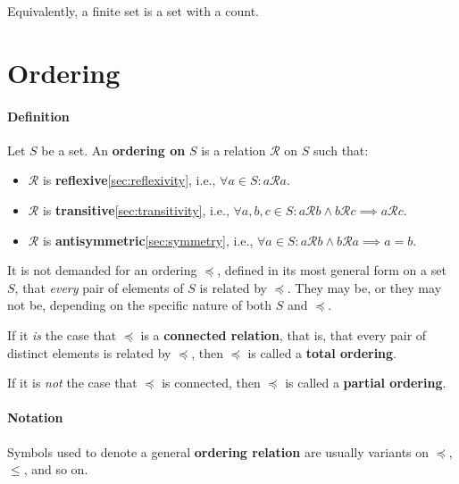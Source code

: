 Equivalently, a finite set is a set with a count.






\section{Ordering}
\label{sec:ordering}

\paragraph{Definition}

Let $S$ be a set. An \textbf{ordering on} $S$ is a relation
$\mathcal{R}$ on $S$ such that:

\begin{itemize}
\item $\mathcal{R}$ is \textbf{reflexive}\ref{sec:reflexivity}, i.e.,
  $\forall a \in S: a \mathcal{R} a$.
\item $\mathcal{R}$ is \textbf{transitive}\ref{sec:transitivity},
  i.e.,
  $\forall a, b, c \in S: a \mathcal{R} b \land b \mathcal{R} c
  \implies a \mathcal{R} c$.
\item $\mathcal{R}$ is \textbf{antisymmetric}\ref{sec:symmetry}, i.e.,
  $\forall a \in S : a \mathcal{R} b \land b \mathcal{R} a \implies a
  = b$.
\end{itemize}

It is not demanded for an ordering $\preceq$, defined in its most
general form on a set $S$, that \textit{every} pair of elements of $S$
is related by $\preceq$. They may be, or they may not be, depending on
the specific nature of both $S$ and $\preceq$.

If it \textit{is} the case that $\preceq$ is a \textbf{connected
  relation}, that is, that every pair of distinct elements is related
by $\preceq$, then $\preceq$ is called a \textbf{total ordering}.

If it is \textit{not} the case that $\preceq$ is connected, then
$\preceq$ is called a \textbf{partial ordering}.


\paragraph{Notation}

Symbols used to denote a general \textbf{ordering relation} are
usually variants on $\preceq$, $\leq$, and so on.

